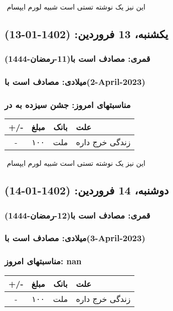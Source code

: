 \documentclass{article}
\newcommand{\rnote}[1]{\marginpar{\textcolor{color}{\StrSubstitute{\##1}{ }{\_}}}}
\newcommand{\myRow}[4]{
    #1 & #2 & #3 & #4 \\ \hline
}
\begin{document}
‌
\rnote{تست}
این نیز یک نوشته تستی است شبیه لورم ایپسام




\newpage
{}
\textcolor{color}{
\section{ یکشنبه، 13 فروردین: (1402-01-13) }
\subsubsection*{قمری: مصادف است با(11-رمضان-1444)} 
\subsubsection*{میلادی: مصادف است با(2-April-2023)}
\subsubsection*{مناسبتهای امروز: جشن سیزده به در}
}


\begin{tabular}{ | c | c | c | p{5cm} |}
    \hline
    \myRow{ +/- }{مبلغ}{بانک}{علت}
    \myRow{-}{۱۰۰}{ملت}{زندگی خرج داره}
\end{tabular}
\newline
\newline

‌
\rnote{تست}
این نیز یک نوشته تستی است شبیه لورم ایپسام




\newpage
{}
\textcolor{color}{
\section{ دوشنبه، 14 فروردین: (1402-01-14) }
\subsubsection*{قمری: مصادف است با(12-رمضان-1444)} 
\subsubsection*{میلادی: مصادف است با(3-April-2023)}
\subsubsection*{مناسبتهای امروز: nan}
}


\begin{tabular}{ | c | c | c | p{5cm} |}
    \hline
    \myRow{ +/- }{مبلغ}{بانک}{علت}
    \myRow{-}{۱۰۰}{ملت}{زندگی خرج داره}
\end{tabular}
\newline
\newline
\end{document}
